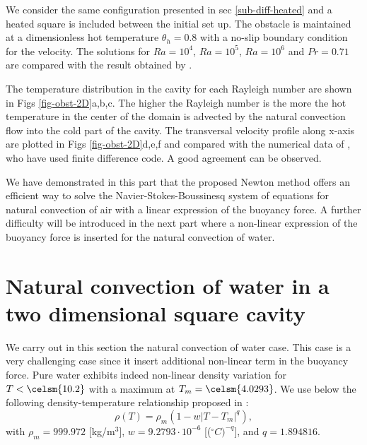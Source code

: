 We consider the same configuration presented in sec \ref{sub-diff-heated} and a heated square is included between the initial set up.
The obstacle is maintained at a dimensionless hot temperature $\theta_h = 0.8$ with a no-slip boundary condition for the velocity.
The solutions for $Ra = 10^4$, $Ra = 10^5$, $Ra = 10^6$ and $Pr = 0.71$ are compared with the result obtained by \cite{Raluca2013}.

The temperature distribution in the cavity for each Rayleigh number are shown in Figs \ref{fig-obst-2D}a,b,c.
The higher the Rayleigh number is the more the hot temperature in the center of the domain is advected by the natural convection flow into the cold part of the cavity. 
The transversal velocity profile along x-axis are plotted in Figs \ref{fig-obst-2D}d,e,f and compared with the numerical data of   \cite{Raluca2013}, who have used finite difference code.
A good agreement can be observed.

We have demonstrated in this part that the proposed Newton method offers an efficient way to solve the Navier-Stokes-Boussinesq system of equations for natural convection of air with a linear expression of the buoyancy force.
A further difficulty will be introduced in the next part where a non-linear expression of the buoyancy force is inserted for the natural convection of water.

\section{Natural convection of water in a two dimensional square cavity}\label{sec: natconv-water}
We carry out in this section the natural convection of water case. This case is a very challenging case since it insert additional non-linear term in the buoyancy force.
Pure water exhibits indeed non-linear density variation for $T< \celsm{10.2}$ with a maximum at $T_m= \celsm{4.0293}$. We use below the following density-temperature relationship  proposed in \cite{Gebhart1977}:
\begin{equation}
\rho(T)=\rho_m \left(1 - w \left|T - T_m\right|^q\right),
\end{equation}
with $\rho_m=999.972$ [kg/m$^3$], $w=9.2793\cdot 10^{-6}$ [($^\circ C)^{-q}$], and $q=1.894816$.

